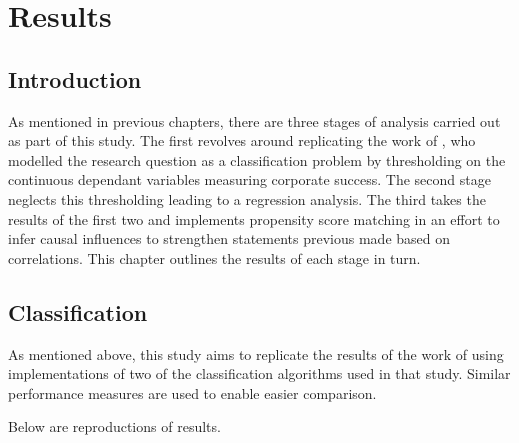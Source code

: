 %
%
%

\chapter{Results}\label{C.Results}

\section{Introduction}\label{S.intro4}
{As mentioned in previous chapters, there are three stages of analysis carried out as part of this study. The first revolves around replicating the work of \cite{moldovan2015learning}, who modelled the research question as a classification problem by thresholding on the continuous dependant variables measuring corporate success. The second stage neglects this thresholding leading to a regression analysis. The third takes the results of the first two and implements propensity score matching in an effort to infer causal influences to strengthen statements previous made based on correlations. This chapter outlines the results of each stage in turn.}
\section{Classification}\label{S.classification4}
{As mentioned above, this study aims to replicate the results of the work of \cite{moldovan2015learning} using implementations of two of the classification algorithms used in that study. Similar performance measures are used to enable easier comparison.}

{Below are reproductions of \cite{moldovan2015learning} results.}\\

